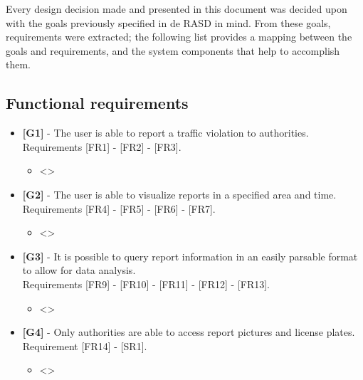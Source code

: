 Every design decision made and presented in this document was decided upon with the goals previously specified in de RASD in mind. From these goals, requirements were extracted; the following list provides a mapping between the goals and requirements, and the system components that help to accomplish them.\\

\subsection{Functional requirements}
\begin{itemize}[label={}]
    \item {\textbf{[G1]}} - The user is able to report a traffic violation to authorities.\\
    Requirements [FR1] - [FR2] - [FR3].

    \begin{itemize}
        \item 
        <>
    \end{itemize}

    \item {\textbf{[G2]}} - The user is able to visualize reports in a specified area and time.\\
    Requirements [FR4] - [FR5] - [FR6] - [FR7].

    \begin{itemize}
        \item 
        <>
    \end{itemize}

    \item {\textbf{[G3]}} - It is possible to query report information in an easily parsable format to allow for data analysis.\\
    Requirements [FR9] - [FR10] - [FR11] - [FR12] - [FR13].

    \begin{itemize}
        \item 
        <>
    \end{itemize}

    \item {\textbf{[G4]}} - Only authorities are able to access report pictures and license plates.\\
    Requirement [FR14] - [SR1].

    \begin{itemize}
        \item 
        <>
    \end{itemize}


\end{itemize}
